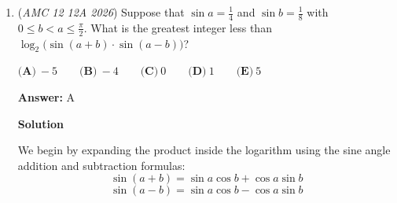 \begin{enumerate}
 The same reasoning applies to the smallest dimension, so
 \[a=b-2\]

 The remaining dimension of the box and the enclosed space must match, so
 \[b=c-2\]

 Solving the system of equations,
 \[(a,b,c)=(6,8,10)\implies a+b+c=\boxed{\textbf{(C)}~24}\]




\textbf{Solution 2}

We can directly find that the dimensions of the inner space are $b-2$, $c-2$, and $2(a-1)=2a-2$. Hence, $\{a,b,c\}=\{b-2,c-2,2a-2\}$.

 Notice that $b-2<c-2$, hence the minimal element in the right set is either $b-2$ or $2(a-2)$. In the first case, we have $a=b-2$. Then, either $b=c-2$ or $b=2a-2$. The former yields $a=b-2$, $b=c-2$, and $c=2a-2$, so $(a,b,c)=(6,8,10)$ upon solving. The latter yields $a=b-2$ and $b=2a-2$, but $c=c-2$, impossible. Finally, the second case yields $a=2(a-2)$, so $\{b,c\}=\{b-2,c-2\}$, impossible. Therefore, $(a,b,c)=(6,8,10)$, so the answer is $6+8+10=24$, or $\boxed{\textbf{(C)}}$.

 



\textbf{Solution 3 (Cheese)}

Since the rotated box, when chugged into the $b \times c$ face of the boxes, must have at least 2 dimensions exactly 2 smaller than $b$ and $c$. The 3 side lengths of the box will thus be 3 terms in an arithmetic sequence; the requested sum of the terms is simply thrice the middle term $b$.

 The only answer choice that is a multiple of 3 is $\boxed{\textbf{(C)}~24}$.

 


	\item (\textit{AMC 12 12A 2026}) Suppose that $\sin a = \frac{1}{4}$ and $\sin b = \frac{1}{8}$ with $0 \le b < a \le  \frac{\pi}{2}$. What is the greatest integer less than $\log_{2}\big( \sin(a+b) \cdot \sin(a-b) \big)$?


 

$\textbf{(A)}\   -5  \qquad 	\textbf{(B)}\   -4  \qquad 	\textbf{(C)}\   0  \qquad 	\textbf{(D)}\   1  \qquad 	\textbf{(E)}\   5$

 \textbf{Answer: }A



\textbf{Solution}

We begin by expanding the product inside the logarithm using the sine angle addition and subtraction formulas:
 \[\sin(a + b) = \sin a \cos b + \cos a \sin b\]
 \[\sin(a - b) = \sin a \cos b - \cos a \sin b\]


\end{enumerate}
